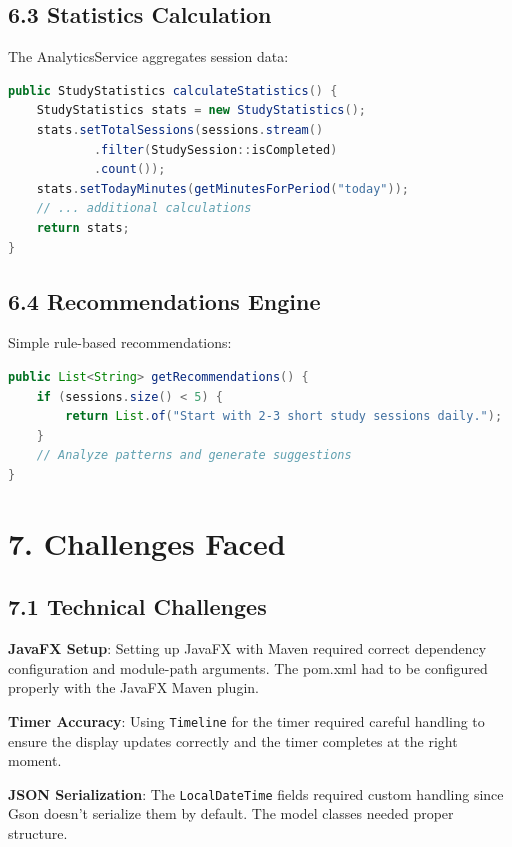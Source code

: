 \documentclass[12pt,a4paper]{article}
\begin{document}
\subsection{6.3 Statistics Calculation}

The AnalyticsService aggregates session data:

\begin{lstlisting}[language=Java, caption={Statistics Calculation}]
public StudyStatistics calculateStatistics() {
    StudyStatistics stats = new StudyStatistics();
    stats.setTotalSessions(sessions.stream()
            .filter(StudySession::isCompleted)
            .count());
    stats.setTodayMinutes(getMinutesForPeriod("today"));
    // ... additional calculations
    return stats;
}
\end{lstlisting}

\subsection{6.4 Recommendations Engine}

Simple rule-based recommendations:

\begin{lstlisting}[language=Java, caption={Recommendations Engine}]
public List<String> getRecommendations() {
    if (sessions.size() < 5) {
        return List.of("Start with 2-3 short study sessions daily.");
    }
    // Analyze patterns and generate suggestions
}
\end{lstlisting}

\section{7. Challenges Faced}

\subsection{7.1 Technical Challenges}

\textbf{JavaFX Setup}: Setting up JavaFX with Maven required correct dependency configuration and module-path arguments. The pom.xml had to be configured properly with the JavaFX Maven plugin.

\textbf{Timer Accuracy}: Using \texttt{Timeline} for the timer required careful handling to ensure the display updates correctly and the timer completes at the right moment.

\textbf{JSON Serialization}: The \texttt{LocalDateTime} fields required custom handling since Gson doesn't serialize them by default. The model classes needed proper structure.
\end{document}
